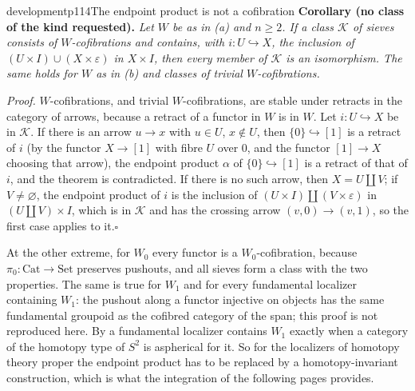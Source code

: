 \begin{dcomment}{development}{p114}{The endpoint product is not a cofibration}
\textbf{Corollary (no class of the kind requested).}\ours
\textit{Let $W$ be as in (a) and $n\geq2$. If a class $\mathcal K$ of sieves consists of $W$-cofibrations and contains, with $i:U\hookrightarrow X$, the inclusion of $(U\times I)\cup(X\times\varepsilon)$ in $X\times I$, then every member of $\mathcal K$ is an isomorphism. The same holds for $W$ as in (b) and classes of trivial $W$-cofibrations.}

\textit{Proof.}
$W$-cofibrations, and trivial $W$-cofibrations, are stable under retracts in the category of arrows, because a retract of a functor in $W$ is in $W$. Let $i:U\hookrightarrow X$ be in $\mathcal K$. If there is an arrow $u\to x$ with $u\in U$, $x\notin U$, then $\{0\}\hookrightarrow[1]$ is a retract of $i$ (by the functor $X\to[1]$ with fibre $U$ over $0$, and the functor $[1]\to X$ choosing that arrow), the endpoint product $\alpha$ of $\{0\}\hookrightarrow[1]$ is a retract of that of $i$, and the theorem is contradicted. If there is no such arrow, then $X=U\amalg V$; if $V\neq\varnothing$, the endpoint product of $i$ is the inclusion of $(U\times I)\amalg(V\times\varepsilon)$ in $(U\amalg V)\times I$, which is in $\mathcal K$ and has the crossing arrow $(v,0)\to(v,1)$, so the first case applies to it.\hfill$\square$

At the other extreme, for $W_0$ every functor is a $W_0$-cofibration, because $\pi_0:\mathrm{Cat}\to\mathrm{Set}$ preserves pushouts, and all sieves form a class with the two properties. The same is true for $W_1$ and for every fundamental localizer containing $W_1$: the pushout along a functor injective on objects has the same fundamental groupoid as the cofibred category of the span; this proof is not reproduced here. By \citet[Proposition~9.2.17]{Cisinski2006} a fundamental localizer contains $W_1$ exactly when a category of the homotopy type of $S^2$ is aspherical for it. So for the localizers of homotopy theory proper the endpoint product has to be replaced by a homotopy-invariant construction, which is what the integration of the following pages provides.
\end{dcomment}


